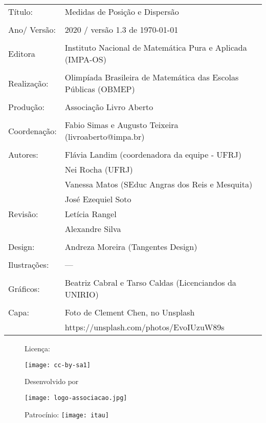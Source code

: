 \begin{tabular}{p{}p{}}
Título: & Medidas de Posição e Dispersão\\
\\
Ano/ Versão: & 2020 / versão 1.3 de \today\\
\\
Editora & Instituto Nacional de Matem\'atica Pura e Aplicada (IMPA-OS)\\
\\
Realização:& Olimp\'iada Brasileira de Matem\'atica das Escolas P\'ublicas (OBMEP)\\
\\
Produção:& Associação Livro Aberto\\
\\
Coordenação: & Fabio Simas e Augusto Teixeira (livroaberto@impa.br)\\
\\
  Autores: & Flávia Landim (coordenadora da equipe - UFRJ)\\
           & Nei Rocha (UFRJ)\\
           & Vanessa Matos (SEduc Angras dos Reis e Mesquita)\\
           & José Ezequiel Soto
\\
Revisão: &  Letícia Rangel  \\
		 &  Alexandre Silva \\
\\
Design: & Andreza Moreira (Tangentes Design) \\
\\
  Ilustrações: & --- \\ 
\\
Gráficos: & Beatriz Cabral e Tarso Caldas (Licenciandos da UNIRIO)\\
\\
  Capa: & Foto de Clement Chen, no Unsplash\\
  		& https://unsplash.com/photos/EvoIUzuW89s \\

\end{tabular}


\begin{figure}[b]
\begin{minipage}[l]{5cm}
\centering

{\large Licença:}

  \texttt{[image: cc-by-sa1]}
\end{minipage}\hfill
\begin{minipage}[c]{5cm}
\centering
{\large Desenvolvido por}

\texttt{[image: logo-associacao.jpg]}
\end{minipage}
\begin{minipage}[r]{5cm}
\centering

{\large Patrocínio:}
  \vspace{1em}
  \texttt{[image: itau]}
\end{minipage}
\end{figure}

